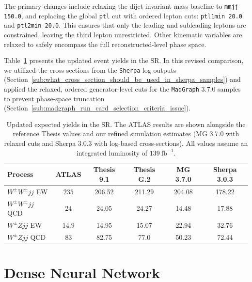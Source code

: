 \documentclass[12pt]{article}
\begin{document}
        The primary changes include relaxing the dijet invariant mass baseline to \verb|mmjj 150.0|, and replacing the global \verb|ptl| cut with ordered lepton cuts: \verb|ptl1min 20.0| and \verb|ptl2min 20.0|. This ensures that only the leading and subleading leptons are constrained, leaving the third lepton unrestricted. Other kinematic variables are relaxed to safely encompass the full reconstructed-level phase space.


        Table~\ref{tab:background_yields_updated} presents the updated event yields in the SR. In this revised comparison, we utilized the cross-sections from the \verb|Sherpa| log outputs (Section~\ref{sub:what_cross_section_should_be_used_in_sherpa_samples}) and applied the relaxed, ordered generator-level cuts for the \verb|MadGraph| 3.7.0 samples to prevent phase-space truncation (Section~\ref{sub:madgraph_run_card_selection_criteria_issue}).
        \begin{table}[htbp]
            \centering
            \caption{Updated expected yields in the SR. The ATLAS results are shown alongside the reference Thesis values and our refined simulation estimates (MG 3.7.0 with relaxed cuts and Sherpa 3.0.3 with log-based cross-sections). All values assume an integrated luminosity of $139~\mathrm{fb}^{-1}$.}
            \label{tab:background_yields_updated}
            \begin{tabular}{l|ccc|cc}
                \hline
                \hline
                Process & ATLAS & Thesis 9.1 & Thesis G.2 & MG 3.7.0 & Sherpa 3.0.3 \\
                \hline
                $W^{\pm}W^{\pm}jj$ EW  & $235$  & 206.52 & 211.29 & 204.08 & 178.22 \\
                $W^{\pm}W^{\pm}jj$ QCD & $24$   & 24.05  & 24.27  & 14.48  & 17.88  \\
                $W^{\pm}Zjj$ EW        & $14.9$ & 14.95  & 15.07  & 22.94  & 32.76  \\
                $W^{\pm}Zjj$ QCD       & $83$   & 82.75  & 77.0   & 50.23  & 72.44  \\
                \hline
                \hline
            \end{tabular}
        \end{table}



\section{Dense Neural Network}%
\label{sec:dense_neural_network}
\end{document}
